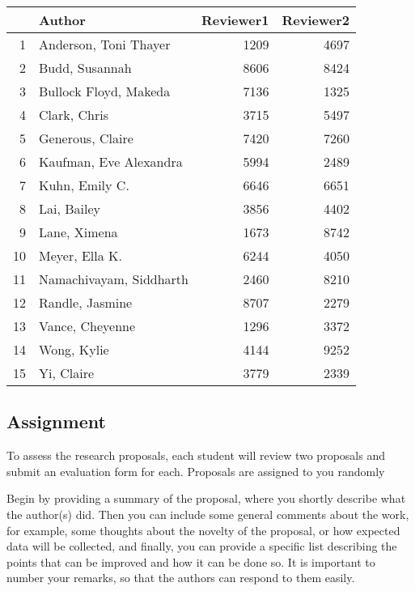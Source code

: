 \documentclass{tufte-handout}\usepackage[]{graphicx}\usepackage[]{color}
\begin{document}
\begin{table}[ht]
\centering
\begin{tabular}{rlrr}
  \hline
 & Author & Reviewer1 & Reviewer2 \\ 
  \hline
1 & Anderson, Toni Thayer & 1209 & 4697 \\ 
  2 & Budd, Susannah & 8606 & 8424 \\ 
  3 & Bullock Floyd, Makeda & 7136 & 1325 \\ 
  4 & Clark, Chris & 3715 & 5497 \\ 
  5 & Generous, Claire & 7420 & 7260 \\ 
  6 & Kaufman, Eve Alexandra & 5994 & 2489 \\ 
  7 & Kuhn, Emily C. & 6646 & 6651 \\ 
  8 & Lai, Bailey & 3856 & 4402 \\ 
  9 & Lane, Ximena & 1673 & 8742 \\ 
  10 & Meyer, Ella K. & 6244 & 4050 \\ 
  11 & Namachivayam, Siddharth & 2460 & 8210 \\ 
  12 & Randle, Jasmine & 8707 & 2279 \\ 
  13 & Vance, Cheyenne & 1296 & 3372 \\ 
  14 & Wong, Kylie & 4144 & 9252 \\ 
  15 & Yi, Claire & 3779 & 2339 \\ 
   \hline
\end{tabular}
\end{table}



\subsection{Assignment}

To assess the research proposals, each student will review two proposals and submit an evaluation form for each. Proposals are assigned to you randomly

Begin by providing a summary of the proposal, where you shortly describe what the author(s) did. Then you can include some general comments about the work, for example, some thoughts about the novelty of the proposal, or how expected data will be collected, and finally, you can provide a specific list describing the points that can be improved and how it can be done so. It is important to number your remarks, so that the authors can respond to them easily.
\end{document}
